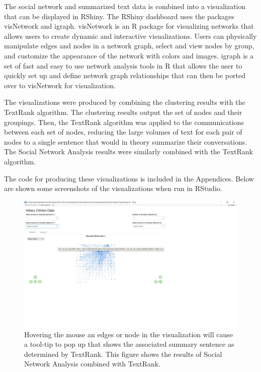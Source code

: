 The social network and summarized text data is combined into a visualization that can be displayed in RShiny. The RShiny dashboard uses the packages visNetwork and igraph. visNetwork is an R package for visualizing networks that allows users to create dynamic and interactive visualizations. Users can physically manipulate edges and nodes in a network graph, select and view nodes by group, and customize the appearance of the network with colors and images. igraph is a set of fast and easy to use network analysis tools in R that allows the user to quickly set up and define network graph relationships that can then be ported over to visNetwork for visualization.

The visualizations were produced by combining the clustering results with the TextRank algorithm.
The clustering results output the set of nodes and their groupings. Then, the TextRank algorithm was applied to the communications between each set of nodes, reducing the large volumes of text for each pair of nodes to a single sentence that would in theory summarize their conversations. The Social Network Analysis results were similarly combined with the TextRank algorithm.

The code for producing these visualizations is included in the Appendices. Below are shown some screenshots of the visualizations when run in RStudio.

\begin{figure}[ht]
	\includegraphics[width=\textwidth]{eric/Viz_Screenshot_1}
	\caption{Hovering the mouse an edges or node in the visualization will cause a tool-tip to pop up that shows the associated summary sentence as determined by TextRank. This figure shows the results of Social Network Analysis combined with TextRank.}
	\label{Viz1}
\end{figure}

